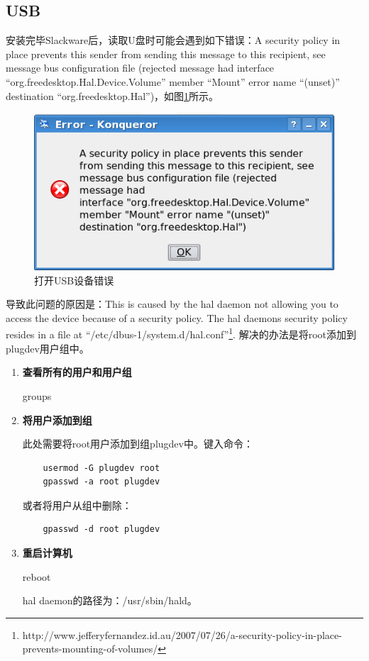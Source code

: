 \documentclass{book}
\begin{document}
\subsection{USB}

安装完毕Slackware后，读取U盘时可能会遇到如下错误：A security policy in place prevents this sender from sending this message to this recipient, see message bus configuration file (rejected message had interface “org.freedesktop.Hal.Device.Volume” member “Mount” error name “(unset)” destination “org.freedesktop.Hal”)，如图\ref*{USBSecurityError}所示。
\begin{figure}[htbp]
	\centering
	\includegraphics[scale=0.7]{USBSecurityError.png}
	\caption{打开USB设备错误}
	\label{USBSecurityError}
\end{figure}
导致此问题的原因是：This is caused by the hal daemon not allowing you to access the device because of a security policy. The hal daemons security policy resides in a file at “/etc/dbus-1/system.d/hal.conf”\footnote{http://www.jefferyfernandez.id.au/2007/07/26/a-security-policy-in-place-prevents-mounting-of-volumes/}. 解决的办法是将root添加到plugdev用户组中。
\begin{enumerate}
	\setcounter{enumi}{0}
	\item{\textbf{查看所有的用户和用户组}}
	
	groups
	
	\item{\textbf{将用户添加到组}}
	
	此处需要将root用户添加到组plugdev中。键入命令：
	\begin{lstlisting}
	usermod -G plugdev root
	gpasswd -a root plugdev
	\end{lstlisting}
	或者将用户从组中删除：
	\begin{lstlisting}
	gpasswd -d root plugdev
	\end{lstlisting}
	
	\item{\textbf{重启计算机}}
	
	reboot
	
	hal daemon的路径为：/usr/sbin/hald。
	
\end{enumerate}
\end{document}
